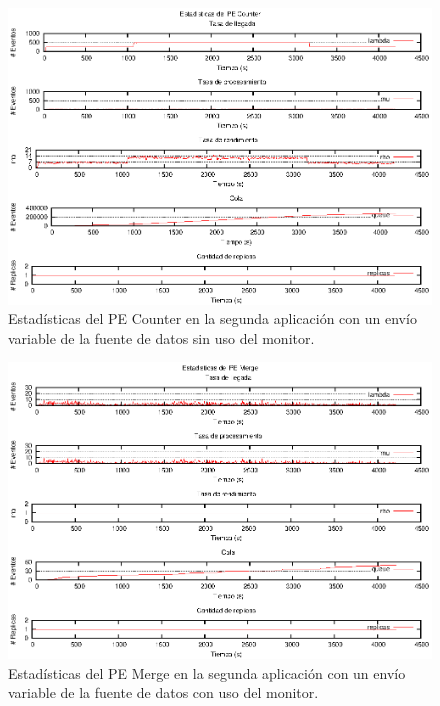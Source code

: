 \begin{figure}[p]
\centering
    \includegraphics[scale=1.1]{images/exp/app2/normal/sm/statusCounterPE.eps}
    \caption{Estadísticas del PE Counter en la segunda aplicación con un envío variable de la fuente de datos sin uso del monitor.}
    \label{fig:app2-normal-statusCounterPE-sm}
\end{figure}

\begin{figure}[p]
\centering
    \includegraphics[scale=1.1]{images/exp/app2/normal/cm/statusMergePE.eps}
    \caption{Estadísticas del PE Merge en la segunda aplicación con un envío variable de la fuente de datos con uso del monitor.}
    \label{fig:app2-normal-statusMergePE-cm}
\end{figure}

